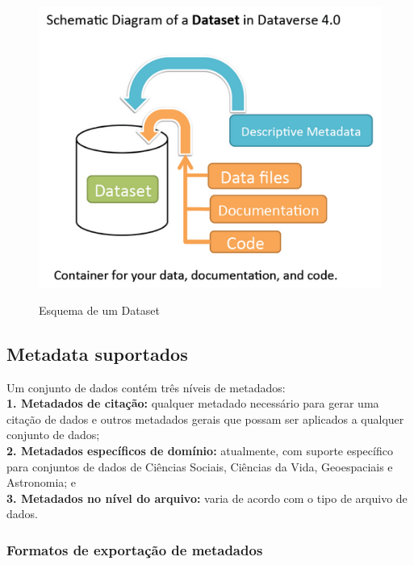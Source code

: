 \documentclass[12pt,hidelinks]{article}
\begin{document}
\begin{figure}[H]
 \caption{Esquema de um Dataset}
                \centering
             \includegraphics[scale=0.5]{dtset.png}
            \label{Dataset}
        \end{figure}

    \subsection{Metadata suportados}
    
\qquad Um conjunto de dados contém três níveis de metadados:\\

\textbf{1. Metadados de citação:} qualquer metadado necessário para gerar uma citação de dados e outros metadados gerais que possam ser aplicados a qualquer conjunto de dados;\\

\textbf{2. Metadados específicos de domínio:} atualmente, com suporte específico para conjuntos de dados de Ciências Sociais, Ciências da Vida, Geoespaciais e Astronomia; e\\

\textbf{3. Metadados no nível do arquivo:} varia de acordo com o tipo de arquivo de dados.

    
        \subsubsection{Formatos de exportação de metadados}
        
\end{document}
